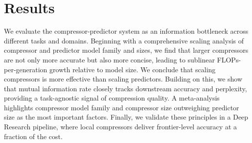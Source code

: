 \documentclass{article} %
\begin{document}

\section{Results}
\label{sec:results}

We evaluate the compressor-predictor system as an information bottleneck across different tasks and domains. 
Beginning with a comprehensive scaling analysis of compressor and predictor model family and sizes, we find that larger compressors are not only more accurate but also more concise, leading to sublinear FLOPs-per-generation growth relative to model size. 
We conclude that scaling compressors is more effective than scaling predictors.
Building on this, we show that mutual information rate closely tracks downstream accuracy and perplexity, providing a task-agnostic signal of compression quality. 
A meta-analysis highlights compressor model family and compressor size outweighing predictor size as the most important factors. 
Finally, we validate these principles in a Deep Research pipeline, where local compressors deliver frontier-level accuracy at a fraction of the cost.
\end{document}
